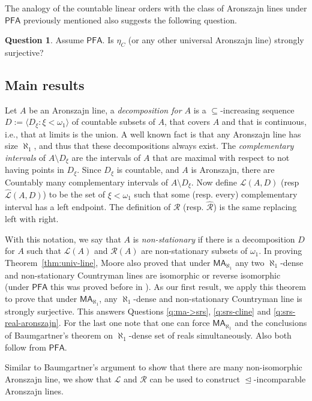 \documentclass[10pt]{amsart}
\theoremstyle{definition}
\newtheorem{question}{Question}
\theoremstyle{remark}
\newcommand{\seb}{\subseteq}
\newcommand{\setm}{\setminus}
\newcommand{\tup}[1]{\langle#1\rangle}
\newcommand{\axiom}[1]{\mathsf{#1}}
\newcommand{\MA}{\axiom{MA}}
\newcommand{\PFA}{\axiom{PFA}}
\newcommand{\sleq}{\trianglelefteq}
\renewcommand{\L}{\mathscr{L}}
\newcommand{\R}{\mathscr{R}}
\newcommand{\La}{\hat{\L}}
\newcommand{\Ra}{\hat{\R}}
\newcommand{\1}{\mathbbm{1}}
\begin{document}
The analogy of the countable linear orders with the class of Aronszajn lines
under $\PFA$ previously mentioned also suggests the following question.

\begin{question}\label{q:univ-srs}
  Assume $\PFA$. Is $\eta_{C}$ (or any other universal Aronszajn line) strongly surjective?
\end{question}

\subsection*{Main results}
Let $A$ be an Aronszajn line, a \emph{decomposition for $A$} is
a $\seb$-increasing sequence $D := \tup{D_{\xi} : \xi < \omega_{1}}$
of countable subsets of $A$,
that covers $A$ and that is continuous, i.e., that at limits is the
union. A well known fact is that any Aronszajn line has size $\aleph_{1}$,
and thus that these decompositions always exist.
The \emph{complementary intervals} of $A \setm D_{\xi}$ are
the intervals of $A$ that are maximal with respect to not having
points in $D_{\xi}$. Since $D_{\xi}$ is countable, and $A$ is
Aronszajn, there are Countably many complementary intervals of $A
\setm D_{\xi}$. Now define $\L(A,D)$ (resp $\La(A,D)$)
to be the set of
$\xi < \omega_{1}$ such that some (resp. every) complementary interval has
a left endpoint. The definition of $\R$ (resp. $\Ra$) is the same
replacing left with right.

With this notation, we say that $A$ is \emph{non-stationary} if there
is a decomposition $D$ for $A$ such that $\L(A)$ and $\R(A)$ are
non-stationary subsets of $\omega_{1}$. In proving Theorem~\ref{thm:univ-line},
Moore \cite{Moore2009} also proved
that under $\MA_{\aleph_{1}}$ any
two $\aleph_{1}$-dense and non-stationary Countryman lines are
isomorphic or reverse isomorphic (under $\PFA$ this was proved before in \cite{ShelahAbraham}). As our first result, we apply this
theorem to prove that under $\MA_{\aleph_{1}}$, any $\aleph_{1}$-dense
and non-stationary Countryman line is strongly surjective.
This answers Questions
\ref{q:ma->srs}, \ref{q:srs-cline} and \ref{q:srs-real-aronszajn}.
For the last one note that one can force $\MA_{\aleph_{1}}$ and the conclusions
of Baumgartner's theorem on $\aleph_{1}$-dense set of reals simultaneously.
Also both follow from $\PFA$.

Similar to Baumgartner's argument \cite{Baumgartner1982} to show that there
are many non-isomorphic Aronszajn line, we show that $\L$ and $\R$
can be used to construct $\sleq$-incomparable Aronszajn lines.
\end{document}
